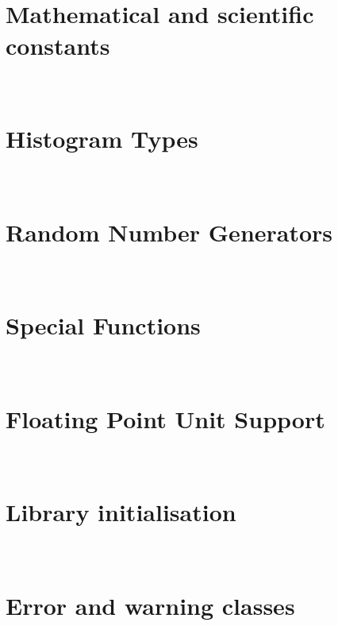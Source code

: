 \documentclass[hyperref]{manual}
\makeatletter
\let\py@OldOldChapter=\chapter
\renewcommand{\chapter}{\py@reset%
                        \py@OldOldChapter}
\makeatother
\begin{document}
\chapter[\protect\module{pygsl.const} --- Mathematical and scientific
constants]{\protect{} \\ Mathematical and scientific
constants} 
\label{cha:const-module}




\chapter[\protect\module{pygsl.histogram} --- Histogram Types]
{\protect{} \\ Histogram Types}
\label{cha:histogram-module}


\chapter[\protect\module{pygsl.rng} --- Random Number Generators]
{\protect{} \\ Random Number Generators}
\label{cha:rng-module}


\chapter[\protect\module{pygsl.sf} --- Special Functions]
{\protect{} \\ Special Functions}
\label{cha:sf-module}




\appendix

\chapter[\protect\module{pygsl.ieee} --- Floating Point Unit Support]
{\protect{} \\ Floating Point Unit Support}
\label{cha:ieee-module}


\chapter[\protect\module{pygsl.init} --- Library initialisation]
{\protect{} \\ Library initialisation}
\label{cha:library-initialisation}


\chapter[\protect\module{pygsl.errors} --- Error and warning classes]
{\protect{} \\ Error and warning classes} 
\label{cha:error-module}



\end{document}
